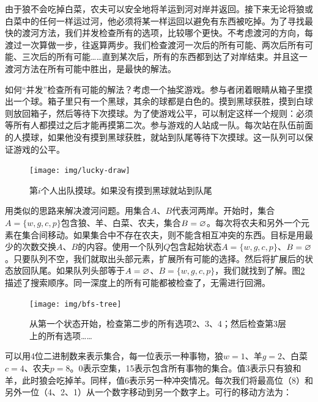 \documentclass[b5paper]{ctexart}
\begin{document}

由于狼不会吃掉白菜，农夫可以安全地将羊运到河对岸并返回。接下来无论将狼或白菜中的任何一样运过河，他必须将某一样运回以避免有东西被吃掉。为了寻找最快的渡河方法，我们并发检查所有的选项，比较哪个更快。不考虑渡河的方向，每渡过一次算做一步，往返算两步。我们检查渡河一次后的所有可能、两次后所有可能、三次后的所有可能……直到某次后，所有的东西都到达了对岸结束。并且这一渡河方法在所有可能中胜出，是最快的解法。

如何“并发”检查所有可能的解法？考虑一个抽奖游戏。参与者闭着眼睛从箱子里摸出一个球。箱子里只有一个黑球，其余的球都是白色的。摸到黑球获胜，摸到白球则放回箱子，然后等待下次摸球。为了使游戏公平，可以制定这样一个规则：必须等所有人都摸过之后才能再摸第二次。参与游戏的人站成一队。每次站在队伍前面的人摸球，如果他没有摸到黑球获胜，就站到队尾等待下次摸球。这一队列可以保证游戏的公平。

\begin{figure}[htbp]
 \centering
 \texttt{[image: img/lucky-draw]}
 \caption{第$i$个人出队摸球。如果没有摸到黑球就站到队尾}
 \label{fig:luck-draw}
\end{figure}

用类似的思路来解决渡河问题。用集合$A$、$B$代表河两岸。开始时，集合$A = \{w, g, c, p\}$包含狼、羊、白菜、农夫，集合$B = \varnothing$。每次将农夫和另外一个元素在集合间移动。如果集合中不存在农夫，则不能含相互冲突的东西。目标是用最少的次数交换$A$、$B$的内容。使用一个队列$Q$包含起始状态$A = \{w, g, c, p\}$、$B=\varnothing$。只要队列不空，我们就取出头部元素，扩展所有可能的选择。然后将扩展后的状态放回队尾。如果队列头部等于$A=\varnothing$、$B=\{w, g, c, p\}$，我们就找到了解。图\ref{fig:bfs-tree}描述了搜索顺序。同一深度上的所有可能都被检查了，无需进行回溯。

\begin{figure}[htbp]
 \centering
 \texttt{[image: img/bfs-tree]}
 \caption{从第一个状态开始，检查第二步的所有选项2、3、4；然后检查第3层上的所有选项……}
 \label{fig:bfs-tree}
\end{figure}

可以用4位二进制数来表示集合，每一位表示一种事物，狼$w=1$、羊$g=2$、白菜$c=4$、农夫$p=8$。0表示空集，15表示包含所有事物的集合。值3表示只有狼和羊，此时狼会吃掉羊。同样，值6表示另一种冲突情况。每次我们将最高位（8）和另外一位（4、2、1）从一个数字移动到另一个数字上。可行的移动方法为：
\end{document}
